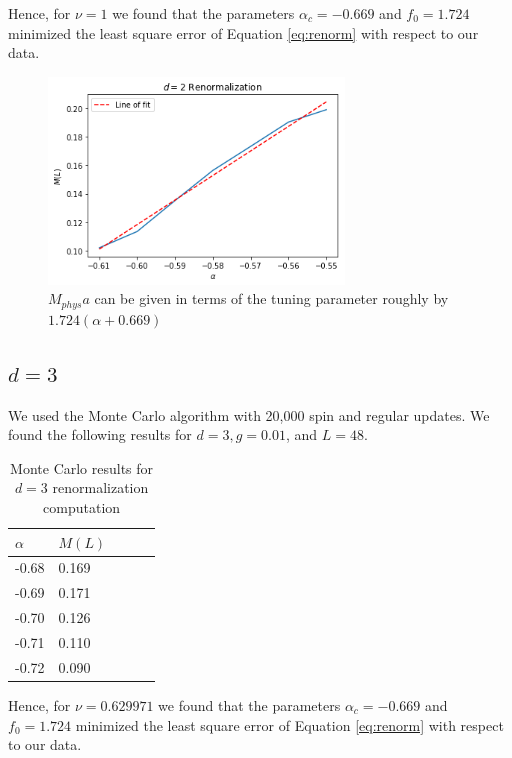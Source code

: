 \documentclass[12]{report}
\newcommand\0{\mathbf{0}}
\newcommand\<{\langle}
\renewcommand\>{\rangle}
\begin{document}
Hence, for $\nu = 1$ we found that the parameters $\alpha_c = -0.669$ and $f_0 = 1.724$ minimized the least square error of Equation \ref{eq:renorm} with respect to our data.


\begin{figure}[H]
\centering
\includegraphics[width=0.7\textwidth]{renormalization_2}
\caption{$M_{phys}a$ can be given in terms of the tuning parameter roughly by $1.724(\alpha + 0.669)$}	
\end{figure}

\subsection{$d=3$}

We used the Monte Carlo algorithm with 20,000 spin and regular updates. We found the following results for $d=3, g = 0.01$, and $L = 48$.

\begin{table}[H]
\centering
\begin{tabular}{|l|l|l|l|l|}
\hline
$\alpha$ & $M(L)$ \\ \hline
-0.68   & 0.169 \\
-0.69 & 0.171 \\
-0.70   & 0.126 \\ 
-0.71 & 0.110 \\
-0.72 & 0.090 \\ \hline
\end{tabular}
\caption{Monte Carlo results for $d=3$ renormalization computation}
\end{table}

Hence, for $\nu = 0.629971$ we found that the parameters $\alpha_c = -0.669$ and $f_0 = 1.724$ minimized the least square error of Equation \ref{eq:renorm} with respect to our data.
\end{document}
